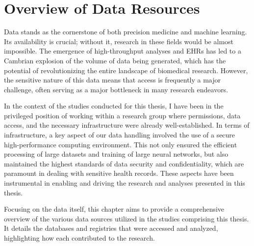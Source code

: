 \chapter{Overview of Data Resources}
\label{chap:data-foundation}

Data stands as the cornerstone of both precision medicine and machine learning.
Its availability is crucial; without it, research in these
fields would be almost impossible. 
The emergence of high-throughput analyses and \acp{EHR} has 
led to a Cambrian explosion of the volume of data being generated,
which has the potential of revolutionizing the 
entire landscape of biomedical research. 
However, the sensitive nature of this data means
that access is frequently a major challenge, 
often serving as a major bottleneck in
many research endeavors.

In the context of the studies conducted for this thesis, I have been in the
privileged position of working within a research group where permissions, 
data access, and the necessary infrastructure were already well-established.
In terms of infrastructure, a key aspect of our data handling involved the use 
of a secure high-performance computing environment. 
This not only ensured the efficient processing of large datasets and 
training of large neural networks, 
but also maintained the highest standards of data security and
confidentiality, which are paramount in dealing with sensitive health records.
These aspects have been instrumental in enabling and driving 
the research and analyses presented in this thesis.

Focusing on the data itself,
this chapter aims to provide a comprehensive overview of the various data
sources utilized in the studies comprising this thesis. It details the
databases and registries that were accessed and analyzed,
highlighting how each contributed to the research. 

